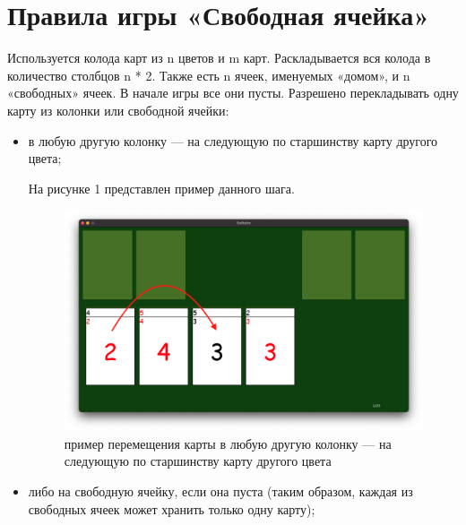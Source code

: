 \documentclass[12pt]{report}
\begin{document}
\setcounter{page}{2}
\newpage
\tableofcontents

\newpage
\chapter*{Правила игры «Свободная ячейка»}

Используется колода карт из n цветов и m карт. Раскладывается вся колода в количество столбцов n * 2. Также есть n ячеек, именуемых «домом», и n «свободных» ячеек. В начале игры все они пусты. Разрешено перекладывать одну карту из колонки или свободной ячейки:

\begin{itemize}
	\item в любую другую колонку — на следующую по старшинству карту другого цвета;
	
	На рисунке 1 представлен пример данного шага.
        \begin{figure}[H]
            	\begin{center}
            		\includegraphics[scale=0.25]{prolog_1.png}
            		\caption{пример перемещения карты в любую другую колонку — на следующую по старшинству карту другого цвета}
            	\end{center}
        \end{figure}

	\item либо на свободную ячейку, если она пуста (таким образом, каждая из свободных ячеек может хранить только одну карту);
	

\end{itemize}
\end{document}
